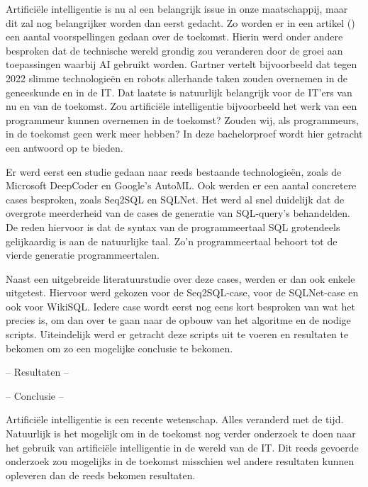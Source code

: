 Artificiële intelligentie is nu al een belangrijk issue in onze maatschappij, maar dit zal nog belangrijker worden dan eerst gedacht. Zo worden er in een artikel (\textcite{Gartner}) een aantal voorspellingen gedaan over de toekomst. Hierin werd onder andere besproken dat de technische wereld grondig zou veranderen door de groei aan toepassingen waarbij AI gebruikt worden. Gartner vertelt bijvoorbeeld dat tegen 2022 slimme technologieën en robots allerhande taken zouden overnemen in de geneeskunde en in de IT. Dat laatste is natuurlijk belangrijk voor de IT'ers van nu en van de toekomst. Zou artificiële intelligentie bijvoorbeeld het werk van een programmeur kunnen overnemen in de toekomst? Zouden wij, als programmeurs, in de toekomst geen werk meer hebben? In deze bachelorproef wordt hier getracht een antwoord op te bieden. 

Er werd eerst een studie gedaan naar reeds bestaande technologieën, zoals de Microsoft DeepCoder en Google's AutoML. Ook werden er een aantal concretere cases besproken, zoals Seq2SQL en SQLNet. Het werd al snel duidelijk dat de overgrote meerderheid van de cases de generatie van SQL-query's behandelden. De reden hiervoor is dat de syntax van de programmeertaal SQL grotendeels gelijkaardig is aan de natuurlijke taal. Zo'n programmeertaal behoort tot de vierde generatie programmeertalen.

Naast een uitgebreide literatuurstudie over deze cases, werden er dan ook enkele uitgetest. Hiervoor werd gekozen voor de Seq2SQL-case, voor de SQLNet-case en ook voor WikiSQL. Iedere case wordt eerst nog eens kort besproken van wat het precies is, om dan over te gaan naar de opbouw van het algoritme en de nodige scripts. Uiteindelijk werd er getracht deze scripts uit te voeren en resultaten te bekomen om zo een mogelijke conclusie te bekomen.

-- Resultaten --

-- Conclusie --

Artificiële intelligentie is een recente wetenschap. Alles veranderd met de tijd. Natuurlijk is het mogelijk om in de toekomst nog verder onderzoek te doen naar het gebruik van artificiële intelligentie in de wereld van de IT. Dit reeds gevoerde onderzoek zou mogelijks in de toekomst misschien wel andere resultaten kunnen opleveren dan de reeds bekomen resultaten. 
